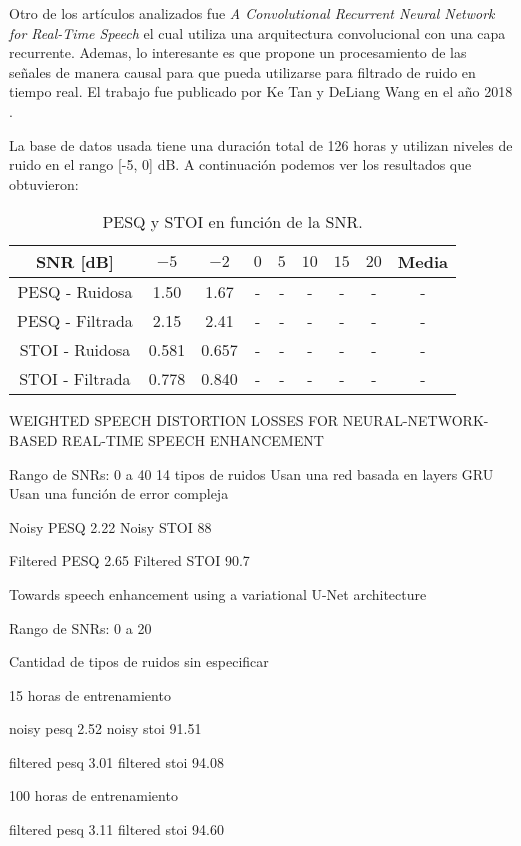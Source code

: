 Otro de los artículos analizados fue \emph{A Convolutional Recurrent Neural Network for Real-Time Speech} el cual utiliza una arquitectura convolucional con una capa recurrente. Ademas, lo interesante es que propone un procesamiento de las señales de manera causal para que pueda utilizarse para filtrado de ruido en tiempo real. El trabajo fue publicado por Ke Tan y DeLiang Wang en el año 2018 \cite{a_convolutional_recurrent_neural_network_for_real_time_speech_enhancement}.

La base de datos usada tiene una duración total de 126 horas y utilizan niveles de ruido en el rango [-5, 0] dB. A continuación podemos ver los resultados que obtuvieron:

\begin{table}[H]
	\centering
	\begin{tabular}{ |c|c|c|c|c|c|c|c|c| } 
		\hline
		SNR [dB] & $-5$ & $-2$ & $0$ & $5$ & $10$ & $15$ & $20$ & Media \\ 
		\hline
		PESQ - Ruidosa & 1.50 & 1.67 & - & - & - & - & - & - \\
		PESQ - Filtrada & 2.15 & 2.41 & - & - & - & - & - & - \\
		STOI - Ruidosa & 0.581 & 0.657 & - & - & - & - & - & - \\
		STOI - Filtrada & 0.778 & 0.840 & - & - & - & - & - & - \\
		\hline
	\end{tabular}
	\caption{PESQ y STOI en función de la SNR.}
\end{table}

WEIGHTED SPEECH DISTORTION LOSSES FOR
NEURAL-NETWORK-BASED REAL-TIME SPEECH ENHANCEMENT

Rango de SNRs: 0 a 40
14 tipos de ruidos
Usan una red basada en layers GRU
Usan una función de error compleja

Noisy PESQ 2.22
Noisy STOI 88

Filtered PESQ 2.65
Filtered STOI 90.7

Towards speech enhancement using a variational U-Net architecture

Rango de SNRs: 0 a 20

Cantidad de tipos de ruidos sin especificar

15 horas de entrenamiento

noisy pesq 2.52 
noisy stoi 91.51

filtered pesq 3.01 
filtered stoi 94.08

100 horas de entrenamiento

filtered pesq 3.11
filtered stoi 94.60

